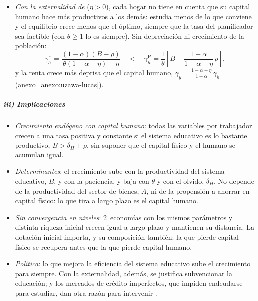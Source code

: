 \documentclass[11pt]{article}
\begin{document}
\begin{itemize}
\begin{itemize}
  \item si una epidemia o una fuga de cerebros destruyen capital humano, $k/h$ queda por encima: rehacer el capital humano exige sacar tiempo de la producción (baja $u$), y la recuperación es más lenta.
  \end{itemize}
\item \emph{Con la externalidad de } ($\eta>0$), cada hogar no tiene en cuenta que su capital humano hace más productivos a los demás: estudia menos de lo que conviene y el equilibrio crece menos que el óptimo, siempre que la tasa del planificador sea factible (con $\theta\geq1$ lo es siempre). Sin depreciación ni crecimiento de la población\nocite{Lucas1988}:
  \[\gamma_h^{\mathrm E}=\frac{(1-\alpha)(B-\rho)}{\theta(1-\alpha+\eta)-\eta}\quad<\quad\gamma_h^{\mathrm P}=\frac{1}{\theta}\left[B-\frac{1-\alpha}{1-\alpha+\eta}\,\rho\right],\]
  y la renta crece más deprisa que el capital humano, $\gamma_y=\frac{1-\alpha+\eta}{1-\alpha}\,\gamma_h$ (anexo~\ref{anexo:uzawa-lucas}).
\end{itemize}

\subparagraph{iii) Implicaciones}

\begin{itemize}
\item \emph{Crecimiento endógeno con capital humano}: todas las variables por trabajador crecen a una tasa positiva y constante si el sistema educativo es lo bastante productivo, $B>\delta_H+\rho$, sin suponer que el capital físico y el humano se acumulan igual.
\item \emph{Determinantes}: el crecimiento sube con la productividad del sistema educativo, $B$, y con la paciencia, y baja con $\theta$ y con el olvido, $\delta_H$. No depende de la productividad del sector de bienes, $A$, ni de la propensión a ahorrar en capital físico: lo que tira a largo plazo es el capital humano.
\item \emph{Sin convergencia en niveles}: 2~economías con los mismos parámetros y distinta riqueza inicial crecen igual a largo plazo y mantienen su distancia. La dotación inicial importa, y su composición también: la que pierde capital físico se recupera antes que la que pierde capital humano.
\item \emph{Política}: lo que mejora la eficiencia del sistema educativo sube el crecimiento para siempre. Con la externalidad, además, se justifica subvencionar la educación; y los mercados de crédito imperfectos, que impiden endeudarse para estudiar, dan otra razón para intervenir .
\end{itemize}
\end{document}
